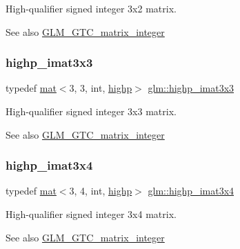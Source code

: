 High-\/qualifier signed integer 3x2 matrix. \begin{DoxySeeAlso}{See also}
\hyperlink{group__gtc__matrix__integer}{G\+L\+M\+\_\+\+G\+T\+C\+\_\+matrix\+\_\+integer} 
\end{DoxySeeAlso}
\mbox{\label{group__gtc__matrix__integer_ga56dfcd09960c88895e72cbdcddc08ae6}} 
\subsubsection{\texorpdfstring{highp\+\_\+imat3x3}{highp\_imat3x3}}
{\footnotesize\ttfamily typedef \hyperlink{structglm_1_1mat}{mat}$<$3, 3, int, \hyperlink{namespaceglm_a36ed105b07c7746804d7fdc7cc90ff25ac6f7eab42eacbb10d59a58e95e362074}{highp}$>$ \hyperlink{group__gtc__matrix__integer_ga56dfcd09960c88895e72cbdcddc08ae6}{glm\+::highp\+\_\+imat3x3}}

High-\/qualifier signed integer 3x3 matrix. \begin{DoxySeeAlso}{See also}
\hyperlink{group__gtc__matrix__integer}{G\+L\+M\+\_\+\+G\+T\+C\+\_\+matrix\+\_\+integer} 
\end{DoxySeeAlso}
\mbox{\label{group__gtc__matrix__integer_ga01595d765e0fef9bf01df5e20a811cd3}} 
\subsubsection{\texorpdfstring{highp\+\_\+imat3x4}{highp\_imat3x4}}
{\footnotesize\ttfamily typedef \hyperlink{structglm_1_1mat}{mat}$<$3, 4, int, \hyperlink{namespaceglm_a36ed105b07c7746804d7fdc7cc90ff25ac6f7eab42eacbb10d59a58e95e362074}{highp}$>$ \hyperlink{group__gtc__matrix__integer_ga01595d765e0fef9bf01df5e20a811cd3}{glm\+::highp\+\_\+imat3x4}}

High-\/qualifier signed integer 3x4 matrix. \begin{DoxySeeAlso}{See also}
\hyperlink{group__gtc__matrix__integer}{G\+L\+M\+\_\+\+G\+T\+C\+\_\+matrix\+\_\+integer} 
\end{DoxySeeAlso}
\mbox{\label{group__gtc__matrix__integer_ga2f3fec7874f434d081a186d11ccbed3c}} 
